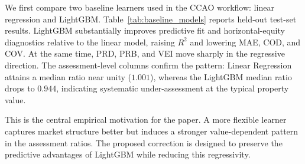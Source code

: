 \documentclass{article}
\theoremstyle{plain}
\theoremstyle{definition}
\newcommand{\1}{\mathbf{1}}
\begin{document}
We first compare two baseline learners used in the CCAO workflow: linear regression and LightGBM. Table~\ref{tab:baseline_models} reports held-out test-set results. LightGBM substantially improves predictive fit and horizontal-equity diagnostics relative to the linear model, raising $R^2$ and lowering MAE, COD, and COV. At the same time, PRD, PRB, and VEI move sharply in the regressive direction. The assessment-level columns confirm the pattern: Linear Regression attains a median ratio near unity ($1.001$), whereas the LightGBM median ratio drops to $0.944$, indicating systematic under-assessment at the typical property value.

This is the central empirical motivation for the paper. A more flexible learner captures market structure better but induces a stronger value-dependent pattern in the assessment ratios. The proposed correction is designed to preserve the predictive advantages of LightGBM while reducing this regressivity.





\begin{table}[!ht]
\centering
\caption{Baseline comparison on the 2023 test set. Lower is better for MAE, COD, and COV. For PRD, median $r$, and mean $r$, values closer to one are preferred; for PRB and VEI, values closer to zero are preferred.}
\label{tab:baseline_models}
\end{table}

\end{document}
